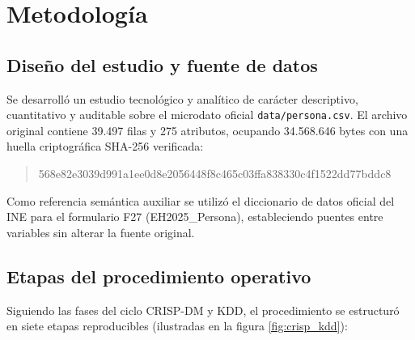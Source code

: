 \section{Metodología}

\subsection{Diseño del estudio y fuente de datos}
Se desarrolló un estudio tecnológico y analítico de carácter descriptivo, cuantitativo y auditable sobre el microdato oficial \texttt{data/persona.csv}. El archivo original contiene 39.497 filas y 275 atributos, ocupando 34.568.646 bytes con una huella criptográfica SHA-256 verificada:
\begin{quote}\small\ttfamily
568e82e3039d991a1ee0d8e2056448f8c465c03ffa838330c4f1522dd77bddc8
\end{quote}
Como referencia semántica auxiliar se utilizó el diccionario de datos oficial del INE para el formulario F27 (EH2025\_Persona), estableciendo puentes entre variables sin alterar la fuente original.

\subsection{Etapas del procedimiento operativo}
Siguiendo las fases del ciclo CRISP-DM y KDD, el procedimiento se estructuró en siete etapas reproducibles (ilustradas en la figura \ref{fig:crisp_kdd}):

